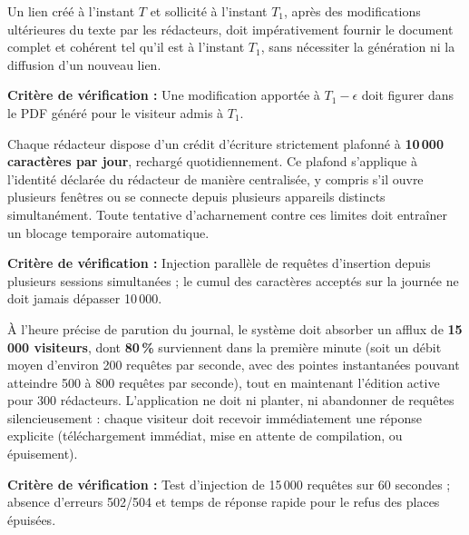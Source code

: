 \begin{criticalbox}
Un lien créé à l'instant $T$ et sollicité à l'instant $T_1$, après des modifications ultérieures du texte par les rédacteurs, doit impérativement fournir le document complet et cohérent tel qu'il est à l'instant $T_1$, sans nécessiter la génération ni la diffusion d'un nouveau lien.

\smallskip
\textbf{Critère de vérification :} Une modification apportée à $T_1 - \epsilon$ doit figurer dans le PDF généré pour le visiteur admis à $T_1$.
\end{criticalbox}

\begin{criticalbox}
Chaque rédacteur dispose d'un crédit d'écriture strictement plafonné à \textbf{10\,000 caractères par jour}, rechargé quotidiennement. Ce plafond s'applique à l'identité déclarée du rédacteur de manière centralisée, y compris s'il ouvre plusieurs fenêtres ou se connecte depuis plusieurs appareils distincts simultanément. Toute tentative d'acharnement contre ces limites doit entraîner un blocage temporaire automatique.

\smallskip
\textbf{Critère de vérification :} Injection parallèle de requêtes d'insertion depuis plusieurs sessions simultanées ; le cumul des caractères acceptés sur la journée ne doit jamais dépasser 10\,000.
\end{criticalbox}

\begin{criticalbox}
À l'heure précise de parution du journal, le système doit absorber un afflux de \textbf{15\,000 visiteurs}, dont \textbf{80\,\%} surviennent dans la première minute (soit un débit moyen d'environ 200 requêtes par seconde, avec des pointes instantanées pouvant atteindre 500 à 800 requêtes par seconde), tout en maintenant l'édition active pour 300 rédacteurs. L'application ne doit ni planter, ni abandonner de requêtes silencieusement : chaque visiteur doit recevoir immédiatement une réponse explicite (téléchargement immédiat, mise en attente de compilation, ou épuisement).

\smallskip
\textbf{Critère de vérification :} Test d'injection de 15\,000 requêtes sur 60 secondes ; absence d'erreurs 502/504 et temps de réponse rapide pour le refus des places épuisées.
\end{criticalbox}

